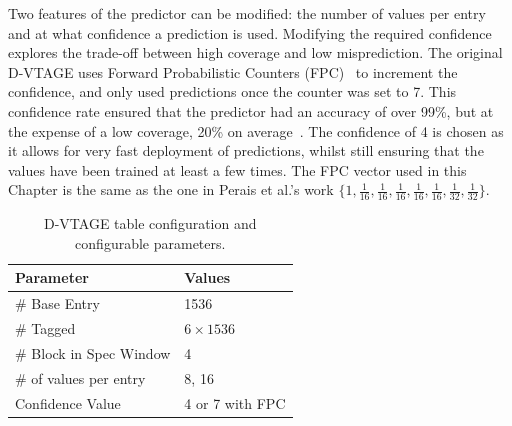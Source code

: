 Two features of the predictor can be modified: the number of values per entry and at what confidence a prediction is used.
Modifying the required confidence explores the trade-off between high coverage and low misprediction.
The original D-VTAGE uses Forward Probabilistic Counters (FPC)~\cite{riley2006fpc} to increment the confidence, and only used predictions once the counter was set to 7.
This confidence rate ensured that the predictor had an accuracy of over 99\%, but at the expense of a low coverage, 20\% on average~\cite{peraisBeBop2015}.
The confidence of 4 is chosen as it allows for very fast deployment of predictions, whilst still ensuring that the values have been trained at least a few times.
The FPC vector used in this Chapter is the same as the one in Perais et al.'s work $\{1,\frac{1}{16},\frac{1}{16},\frac{1}{16},\frac{1}{16},\frac{1}{16},\frac{1}{32},\frac{1}{32}\}$.
 


\begin{table}[t]
\small
\centering
\begin{tabular}{p{5.2cm} p{3cm}}
\toprule
\textbf{Parameter} & \textbf{Values} \\ \midrule
\# Base Entry & 1536\\
\# Tagged & $6\times1536$\\
\# Block in Spec Window & 4 \\ \hline \midrule
\# of values per entry & 8, 16\\
Confidence Value & 4 or 7 with FPC \\ \bottomrule
\end{tabular}
  \caption{D-VTAGE table configuration and configurable parameters.}\label{tab:vtage-conf}
\vspace{1em}
\end{table}


